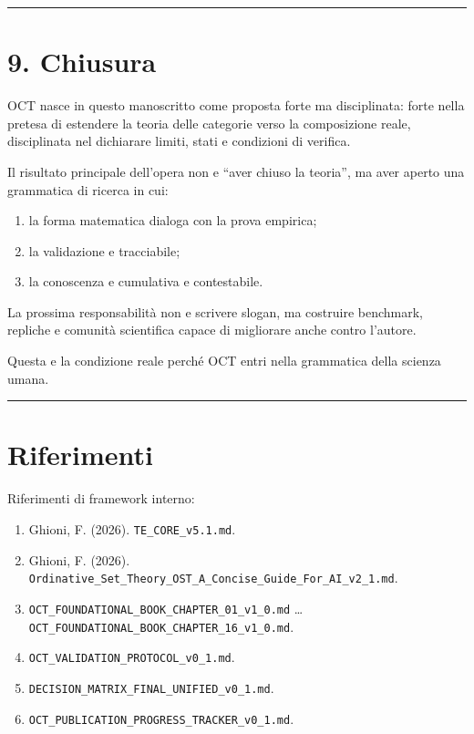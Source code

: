 \begin{center}\rule{0.5\linewidth}{0.5pt}\end{center}

\section{9. Chiusura}

OCT nasce in questo manoscritto come proposta forte ma disciplinata: forte nella pretesa di estendere la teoria delle categorie verso la composizione reale, disciplinata nel dichiarare limiti, stati e condizioni di verifica.

Il risultato principale dell'opera non e ``aver chiuso la teoria'', ma aver aperto una grammatica di ricerca in cui:

\begin{enumerate}
\def\labelenumi{\arabic{enumi}.}
\tightlist
\item
  la forma matematica dialoga con la prova empirica;
\item
  la validazione e tracciabile;
\item
  la conoscenza e cumulativa e contestabile.
\end{enumerate}

La prossima responsabilità non e scrivere slogan, ma costruire benchmark, repliche e comunità scientifica capace di migliorare anche contro l'autore.

Questa e la condizione reale perché OCT entri nella grammatica della scienza umana.

\begin{center}\rule{0.5\linewidth}{0.5pt}\end{center}

\section{Riferimenti}

Riferimenti di framework interno:

\begin{enumerate}
\def\labelenumi{\arabic{enumi}.}
\tightlist
\item
  Ghioni, F. (2026). \texttt{TE\_CORE\_v5.1.md}.
\item
  Ghioni, F. (2026). \texttt{Ordinative\_Set\_Theory\_OST\_A\_Concise\_Guide\_For\_AI\_v2\_1.md}.
\item
  \texttt{OCT\_FOUNDATIONAL\_BOOK\_CHAPTER\_01\_v1\_0.md} \ldots{} \texttt{OCT\_FOUNDATIONAL\_BOOK\_CHAPTER\_16\_v1\_0.md}.
\item
  \texttt{OCT\_VALIDATION\_PROTOCOL\_v0\_1.md}.
\item
  \texttt{DECISION\_MATRIX\_FINAL\_UNIFIED\_v0\_1.md}.
\item
  \texttt{OCT\_PUBLICATION\_PROGRESS\_TRACKER\_v0\_1.md}.
\end{enumerate}

